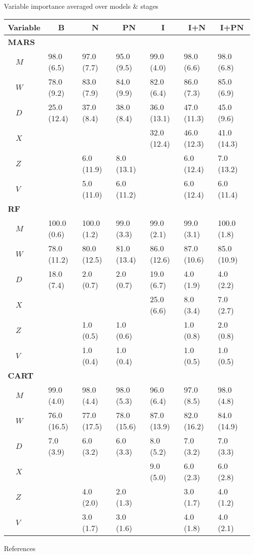 \documentclass[handout]{beamer}
\begin{document}
\appendix

\begin{frame}[t]{Variable importance averaged over models \& stages}
  \begin{table}[!ht]
      \scriptsize
\begin{center}
\begin{tabular}{lllllll}
\toprule
\multicolumn{1}{l}{Variable}&\multicolumn{1}{c}{B}&\multicolumn{1}{c}{N}&\multicolumn{1}{c}{PN}&\multicolumn{1}{c}{I}&\multicolumn{1}{c}{I+N}&\multicolumn{1}{c}{I+PN}\tabularnewline
\midrule
{\bfseries MARS}&&&&&&\tabularnewline
~~$M$&98.0 (6.5)&97.0 (7.7)&95.0 (9.5)&99.0 (4.0)&98.0 (6.6)&98.0 (6.8)\tabularnewline
~~$W$&78.0 (9.2)&83.0 (7.9)&84.0 (9.9)&82.0 (6.4)&86.0 (7.3)&85.0 (6.9)\tabularnewline
~~$D$&25.0 (12.4)&37.0 (8.4)&38.0 (8.4)&36.0 (13.1)&47.0 (11.3)&45.0 (9.6)\tabularnewline
~~$X$&&&&32.0 (12.4)&46.0 (12.3)&41.0 (14.3)\tabularnewline
~~$Z$&&6.0 (11.9)&8.0 (13.1)&&6.0 (12.4)&7.0 (13.2)\tabularnewline
~~$V$&&5.0 (11.0)&6.0 (11.2)&&6.0 (12.4)&6.0 (11.4)\tabularnewline
\midrule
{\bfseries RF}&&&&&&\tabularnewline
~~$M$&100.0 (0.6)&100.0 (1.2)&99.0 (3.3)&99.0 (2.1)&99.0 (3.1)&100.0 (1.8)\tabularnewline
~~$W$&78.0 (11.2)&80.0 (12.5)&81.0 (13.4)&86.0 (12.6)&87.0 (10.6)&85.0 (10.9)\tabularnewline
~~$D$&18.0 (7.4)&2.0 (0.7)&2.0 (0.7)&19.0 (6.7)&4.0 (1.9)&4.0 (2.2)\tabularnewline
~~$X$&&&&25.0 (6.6)&8.0 (3.4)&7.0 (2.7)\tabularnewline
~~$Z$&&1.0 (0.5)&1.0 (0.6)&&1.0 (0.8)&2.0 (0.8)\tabularnewline
~~$V$&&1.0 (0.4)&1.0 (0.4)&&1.0 (0.5)&1.0 (0.5)\tabularnewline
\midrule
{\bfseries CART}&&&&&&\tabularnewline
~~$M$&99.0 (4.0)&98.0 (4.4)&98.0 (5.3)&96.0 (6.4)&97.0 (8.5)&98.0 (4.8)\tabularnewline
~~$W$&76.0 (16.5)&77.0 (17.5)&78.0 (15.6)&87.0 (13.9)&82.0 (16.2)&84.0 (14.9)\tabularnewline
~~$D$&7.0 (3.9)&6.0 (3.2)&6.0 (3.3)&8.0 (5.2)&7.0 (3.2)&7.0 (3.3)\tabularnewline
~~$X$&&&&9.0 (5.0)&6.0 (2.3)&6.0 (2.8)\tabularnewline
~~$Z$&&4.0 (2.0)&2.0 (1.3)&&3.0 (1.7)&4.0 (1.2)\tabularnewline
~~$V$&&3.0 (1.7)&3.0 (1.6)&&4.0 (1.8)&4.0 (2.1)\tabularnewline
\bottomrule
\end{tabular}\end{center}
\end{table}
\end{frame}

\begin{frame}[allowframebreaks]{References}

\printbibliography[heading=none]

\end{frame}
\end{document}
